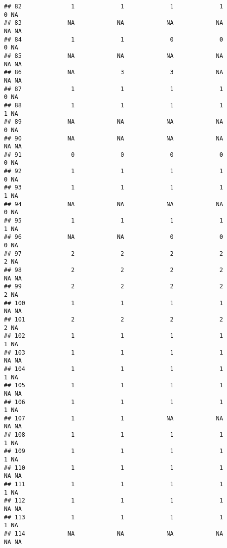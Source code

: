 \documentclass[
]{article}
\begin{document}
\begin{verbatim}
## 82              1             1             1             1             0 NA
## 83             NA            NA            NA            NA            NA NA
## 84              1             1             0             0             0 NA
## 85             NA            NA            NA            NA            NA NA
## 86             NA             3             3            NA            NA NA
## 87              1             1             1             1             0 NA
## 88              1             1             1             1             1 NA
## 89             NA            NA            NA            NA             0 NA
## 90             NA            NA            NA            NA            NA NA
## 91              0             0             0             0             0 NA
## 92              1             1             1             1             0 NA
## 93              1             1             1             1             1 NA
## 94             NA            NA            NA            NA             0 NA
## 95              1             1             1             1             1 NA
## 96             NA            NA             0             0             0 NA
## 97              2             2             2             2             2 NA
## 98              2             2             2             2            NA NA
## 99              2             2             2             2             2 NA
## 100             1             1             1             1            NA NA
## 101             2             2             2             2             2 NA
## 102             1             1             1             1             1 NA
## 103             1             1             1             1            NA NA
## 104             1             1             1             1             1 NA
## 105             1             1             1             1            NA NA
## 106             1             1             1             1             1 NA
## 107             1             1            NA            NA            NA NA
## 108             1             1             1             1             1 NA
## 109             1             1             1             1             1 NA
## 110             1             1             1             1            NA NA
## 111             1             1             1             1             1 NA
## 112             1             1             1             1            NA NA
## 113             1             1             1             1             1 NA
## 114            NA            NA            NA            NA            NA NA

\end{verbatim}
\end{document}
